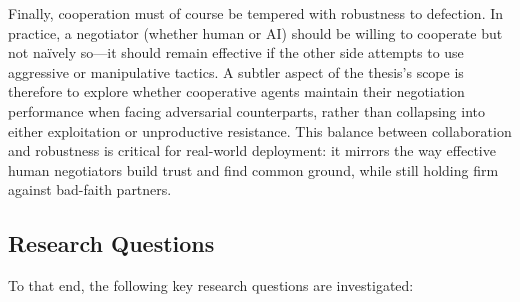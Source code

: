 \documentclass[12pt,a4paper]{article}
\begin{document}
\par
Finally, cooperation must of course be tempered with robustness to defection. In practice, a negotiator (whether human or AI) should be willing to cooperate but not naïvely so---it should remain effective if the other side attempts to use aggressive or manipulative tactics. A subtler aspect of the thesis's scope is therefore to explore whether cooperative agents maintain their negotiation performance when facing adversarial counterparts, rather than collapsing into either exploitation or unproductive resistance. This balance between collaboration and robustness is critical for real-world deployment: it mirrors the way effective human negotiators build trust and find common ground, while still holding firm against bad-faith partners.


\subsection{Research Questions}
To that end, the following key research questions are investigated:
\end{document}
